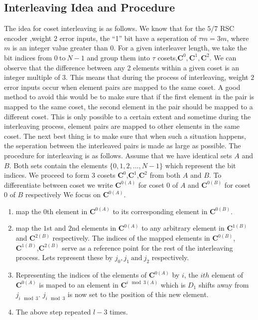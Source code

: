 \documentclass[11pt, oneside, dvipdfmx]{book}
\begin{document}
 \subsection{Interleaving Idea and Procedure}
 The idea for coset interleaving is as follows. We know that for the $5/7$ RSC encoder ,weight $2$ error inputs, the ``1'' bit have a seperation of $\tau m=3m$, where $m$ is an integer value greater than $0$. For a given interleaver length, we take the bit indices from $0 ~\text{to}~N-1$ and group them into $\tau$ cosets,$\mathbf{C}^0,\mathbf{C}^1,\mathbf{C}^2$. We can observe that the difference between any 2 elements within a given coset is an integer multiple of $3$. This means that during the process of interleaving, weight $2$ error inputs occur when element pairs are mapped to the same coset. A good method to avoid this would be to make sure that if the first element in the pair is mapped to the same coset, the second element in the pair should be mapped to a different coset. This is only possible to a certain extent and sometime during the interleaving process, element pairs are mapped to other elements in the same coset. The next best thing is to make sure that when such a situation happens, the seperation between the interleaved pairs is made as large as possible.
 The procedure for interleaving is as follows. Assume that we have identical sets $A$ and $B$. Both sets contain the elements $\{0,1,2,...,N-1\}$ which represent the bit indices. We proceed to form 3 cosets $\mathbf{C}^{0}$,$\mathbf{C}^1$,$\mathbf{C}^2$ from both $A$ and $B$. To differentiate between coset we write $\mathbf{C}^{0(A)}$ for coset $0$ of $A$ and $\mathbf{C}^{0(B)}$ for coset $0$ of $B$ respectively
  We focus on $\mathbf{C}^{0(A)}$.
 
 \begin{enumerate}
 \item map the $0$th element in $\mathbf{C}^{0(A)}$ to its corresponding element in $\mathbf{C}^{0(B)}$.
 
 \item map the $1$st and $2$nd elements  in $\mathbf{C}^{0(A)}$ to any arbitrary element in $\mathbf{C}^{1(B)}$ and $\mathbf{C}^{2(B)}$  respectively. The indices of the mapped elements in $\mathbf{C}^{0(B)}$,$\mathbf{C}^{1(B)}$,$\mathbf{C}^{2(B)}$
 serve as a reference point for the rest of the interleaving process. Lets represent these by $j_0,j_1~\text{and}~j_2$ respectively.
 
 \item Representing the indices of the elements of $\mathbf{C}^{0(A)}$ by $i$, the $ith$ element of $\mathbf{C}^{0(A)}$ is maped to an element in $\mathbf{C}^{i \mod 3(A)}$ which is $D_1$ shifts away from $j_{i \mod 3}$. $j_{i \mod 3}$ is now set to the position of this new element.
 
 \item The above step repeated $l-3$ times.
 \end{enumerate}
 
\end{document}
